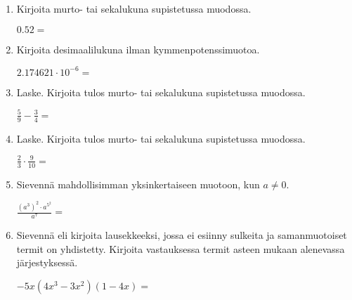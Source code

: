 \documentclass[finnish, a4paper, 12pt]{article}
\begin{document}
	\begin{enumerate}[leftmargin=*]
		\setlength\itemsep{1em}
		
		\item %
		Kirjoita murto- tai sekalukuna supistetussa muodossa. 
		
		\(
		0.52 = 
		\) %
		
		\vspace{8pt}
		
		\item %
		Kirjoita desimaalilukuna ilman kymmenpotenssimuotoa. 
		
		\(
		2.174621\cdot 10^{-6} = 
		\) %
		
		\vspace{8pt}
		
		\item %
		Laske. Kirjoita tulos murto- tai sekalukuna supistetussa muodossa.
		
		\(
		\displaystyle
		\frac{5}{9}-\frac{3}{4} = 
		\) %
		
		\vspace{8pt}
		
		\item %
		Laske. Kirjoita tulos murto- tai sekalukuna supistetussa muodossa.
		
		\(
		\displaystyle
		\frac{2}{3}\cdot\frac{9}{10} = 
		\) %
		
		\vspace{8pt}
		
		\item %
		Sievennä mahdollisimman yksinkertaiseen muotoon, kun \(a \not = 0\). 
		
		\(
		\displaystyle
		\frac{\left(a^3\right)^2 \cdot a^{5^2}}{a^7} =
		\phantom{mmmmmmmmmmmmmmm}
		\) %
		
		\vspace{8pt}
		
		\item %
		Sievennä eli kirjoita lausekkeeksi, jossa ei esiinny sulkeita ja 
		samanmuotoiset termit on yhdistetty. 
		Kirjoita vastauksessa termit asteen mukaan alenevassa järjestyksessä. 
		
		\(
		\displaystyle
		-5x(4x^3 - 3x^2)(1 - 4x) = 
		\) %
		

\end{enumerate}
\end{document}
